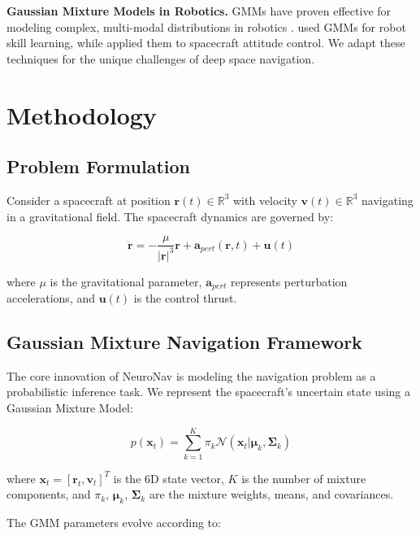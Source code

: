 \documentclass{article}
\begin{document}
\textbf{Gaussian Mixture Models in Robotics.} GMMs have proven effective for modeling complex, multi-modal distributions in robotics \cite{calinon2016tutorial}. \cite{pervez2017learning} used GMMs for robot skill learning, while \cite{silverstein2018gaussian} applied them to spacecraft attitude control. We adapt these techniques for the unique challenges of deep space navigation.

\section{Methodology}

\subsection{Problem Formulation}

Consider a spacecraft at position $\mathbf{r}(t) \in \mathbb{R}^3$ with velocity $\mathbf{v}(t) \in \mathbb{R}^3$ navigating in a gravitational field. The spacecraft dynamics are governed by:

\begin{equation}
\ddot{\mathbf{r}} = -\frac{\mu}{|\mathbf{r}|^3}\mathbf{r} + \mathbf{a}_{pert}(\mathbf{r}, t) + \mathbf{u}(t)
\label{eq:dynamics}
\end{equation}

where $\mu$ is the gravitational parameter, $\mathbf{a}_{pert}$ represents perturbation accelerations, and $\mathbf{u}(t)$ is the control thrust.

\subsection{Gaussian Mixture Navigation Framework}

The core innovation of NeuroNav is modeling the navigation problem as a probabilistic inference task. We represent the spacecraft's uncertain state using a Gaussian Mixture Model:

\begin{equation}
p(\mathbf{x}_t) = \sum_{k=1}^K \pi_k \mathcal{N}(\mathbf{x}_t | \boldsymbol{\mu}_k, \boldsymbol{\Sigma}_k)
\label{eq:gmm}
\end{equation}

where $\mathbf{x}_t = [\mathbf{r}_t, \mathbf{v}_t]^T$ is the 6D state vector, $K$ is the number of mixture components, and $\pi_k$, $\boldsymbol{\mu}_k$, $\boldsymbol{\Sigma}_k$ are the mixture weights, means, and covariances.

The GMM parameters evolve according to:
\end{document}
